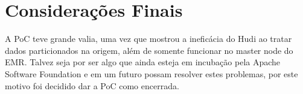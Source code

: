 \chapter{Considerações Finais}
A PoC teve grande valia, uma vez que mostrou a 
ineficácia do Hudi ao tratar dados particionados na origem, além de somente funcionar no master node do EMR. Talvez seja por ser algo que ainda esteja em incubação pela Apache Software Foundation e em um futuro possam resolver estes problemas, por este motivo foi decidido dar a PoC como encerrada.